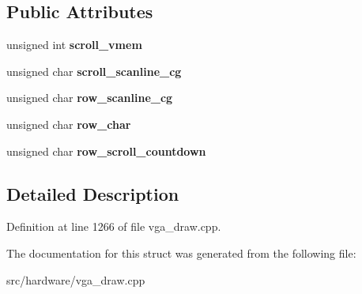 \subsection*{Public Attributes}
\begin{DoxyCompactItemize}
\item 
\hypertarget{structText__Draw__State_a72dcde92c1d0b0338acc888a51f30914}{unsigned int {\bfseries scroll\-\_\-vmem}}\label{structText__Draw__State_a72dcde92c1d0b0338acc888a51f30914}

\item 
\hypertarget{structText__Draw__State_ad34090de4ca22fb0777f5eb7056cf5e9}{unsigned char {\bfseries scroll\-\_\-scanline\-\_\-cg}}\label{structText__Draw__State_ad34090de4ca22fb0777f5eb7056cf5e9}

\item 
\hypertarget{structText__Draw__State_a699f693c31130b23e9ba2380e8c80f20}{unsigned char {\bfseries row\-\_\-scanline\-\_\-cg}}\label{structText__Draw__State_a699f693c31130b23e9ba2380e8c80f20}

\item 
\hypertarget{structText__Draw__State_a806bd82f87fd54eb3186dabad62f5771}{unsigned char {\bfseries row\-\_\-char}}\label{structText__Draw__State_a806bd82f87fd54eb3186dabad62f5771}

\item 
\hypertarget{structText__Draw__State_a013c45ffb9b60f0dc579952522746518}{unsigned char {\bfseries row\-\_\-scroll\-\_\-countdown}}\label{structText__Draw__State_a013c45ffb9b60f0dc579952522746518}

\end{DoxyCompactItemize}


\subsection{Detailed Description}


Definition at line 1266 of file vga\-\_\-draw.\-cpp.



The documentation for this struct was generated from the following file\-:\begin{DoxyCompactItemize}
\item 
src/hardware/vga\-\_\-draw.\-cpp\end{DoxyCompactItemize}
